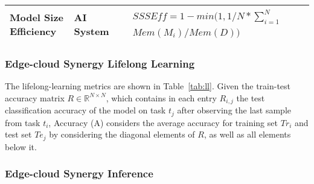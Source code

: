 \begin{table}[!ht]
\begin{tabular}{|p{2cm}|l|p{6cm}|p{3cm}|p{1.5cm}|}
Model Size Efficiency
& AI System
& 
\parbox{3cm}{
    \begin{equation} \label{equ:ssse} 
    \begin{split}
& SSSEff = 1 - min(1, 1/N * \sum_{i=1}^N \\
& Mem(M_i) / Mem(D))
    \end{split} 
    \end{equation} 
}
&  
& \cite{DBLP:journals/corr/abs-1810-13166,DBLP:conf/nips/Lopez-PazR17}       
\\ \hline

\end{tabular}
\end{table}




\subsubsection{Edge-cloud Synergy Lifelong Learning}

The lifelong-learning metrics are shown in Table~\ref{tab:ll}. Given the train-test accuracy matrix $R \in \mathbb{R}^{N \times N}$, which contains in each entry $R_{i,j}$ the test classification accuracy of the model on task $t_j$ after observing the last sample from task $t_i$, Accuracy (A) considers the average accuracy for training set $Tr_i$ and test set $Te_j$ by considering the diagonal elements of $R$, as well as all elements below it. 

















\subsubsection{Edge-cloud Synergy Inference}

